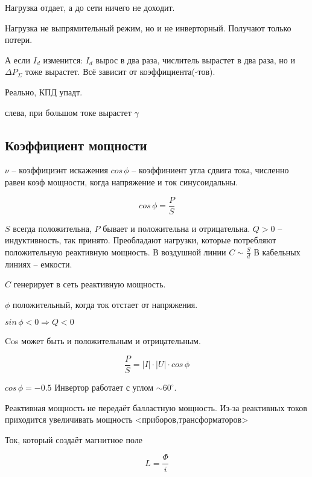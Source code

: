 Нагрузка отдает, а до сети ничего не доходит.

Нагрузка не выпрямительный режим, но и не инверторный.
Получают только потери.

А если $I_d$ изменится: $I_d$ вырос в два раза, числитель вырастет в два раза,
но и ${\scriptstyle \Delta}P_\Sigma$ тоже вырастет. Всё зависит от
коэффициента(-тов).

Реально, КПД упадт.

слева, при большом токе вырастет $\gamma$

\subsection{Коэффициент мощности}
$\nu$ -- коэффициэнт искажения $cos\,\phi$ -- коэффиниент угла сдвига тока,
численно равен коэф мощности, когда напряжение и ток синусоидальны.

$$
cos\,\phi = \frac{P}{S}
$$

$S$ всегда положительна, $P$ бывает и положительна и отрицательна.
$Q>0$ -- индуктивность, так принято. Преобладают нагрузки, которые
потребляют положительную реактивную мощность.
В воздушной линии $C\sim\frac{S}{d}$
В кабельных линиях -- емкости.

$C$ генерирует в сеть реактивную мощность.

$\phi$ положительный, когда ток отстает от напряжения.

$sin\,\phi<0 \Rightarrow Q<0$

Cos может быть и положительным и отрицательным.

$$
\frac{P}{S} = |I|\cdot|U|\cdot cos\,\phi
$$

$cos\,\phi=-0.5$ Инвертор работает с углом $\sim 60^\circ$.

Реактивная мощность не передаёт балластную мощность. Из-за реактивных токов
приходится увеличивать мощность <приборов,трансформаторов>

Ток, который создаёт магнитное поле

$$
L=\frac{\Phi}{i}
$$

